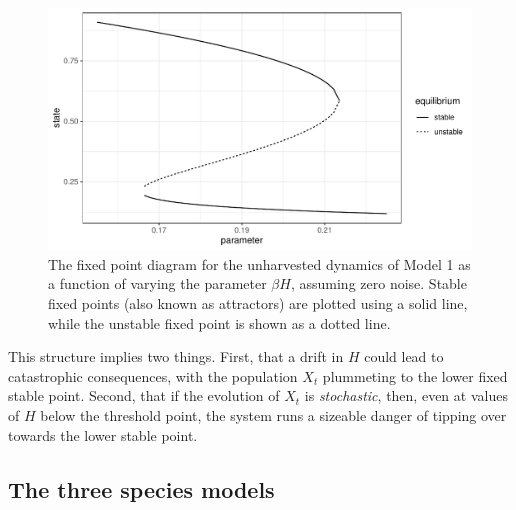 \documentclass{article}
\begin{document}
\begin{figure}
\includegraphics[width=6.5in]{figures/MayStablePoints} \caption{The fixed point diagram for the unharvested dynamics of Model 1 as a function of varying the parameter $\beta H$, assuming zero noise. Stable fixed points (also known as attractors) are plotted using a solid line, while the unstable fixed point is shown as a dotted line.}\label{fig:may}
\end{figure}

This structure implies two things. First, that a drift in \(H\) could
lead to catastrophic consequences, with the population \(X_t\)
plummeting to the lower fixed stable point. Second, that if the
evolution of \(X_t\) is \emph{stochastic}, then, even at values of \(H\)
below the threshold point, the system runs a sizeable danger of tipping
over towards the lower stable point.

\hypertarget{the-three-species-models}{%
\subsection{The three species models}\label{the-three-species-models}}
\end{document}
